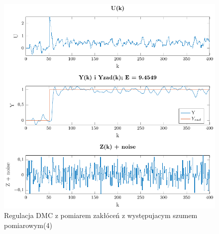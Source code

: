 \documentclass[a4paper,titlepage,11pt,twosides,floatssmall]{mwrep}
\begin{document}
\begin{figure}[H]
	\centering
	\includegraphics{../../Lab2/PDF_rysunki/Z7_Szum4.pdf}
	\caption{Regulacja DMC z pomiarem zakłóceń z występujacym szumem pomiarowym(4)}
	\label{szum4}
\end{figure}
\end{document}
